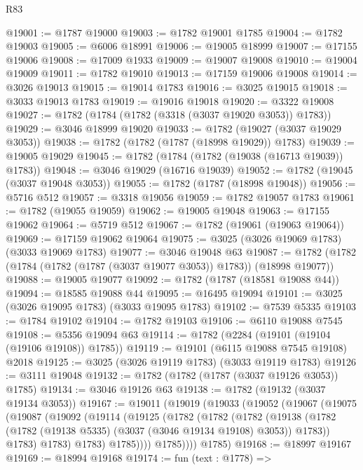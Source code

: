 \begin{lexlean}{R83}
\begin{coremodule}
@19001 := @1787 @19000
@19003 := @1782 @19001 @1785
@19004 := @1782 @19003
@19005 := @6006 @18991
@19006 := @19005 @18999
@19007 := @17155 @19006
@19008 := @17009 @1933
@19009 := @19007 @19008
@19010 := @19004 @19009
@19011 := @1782 @19010
@19013 := @17159 @19006 @19008
@19014 := @3026 @19013
@19015 := @19014 @1783
@19016 := @3025 @19015
@19018 := @3033 @19013 @1783
@19019 := @19016 @19018
@19020 := @3322 @19008
@19027 := @1782 (@1784 (@1782 (@3318 (@3037 @19020 @3053)) @1783))
@19029 := @3046 @18999 @19020
@19033 := @1782 (@19027 (@3037 @19029 @3053))
@19038 := @1782 (@1782 (@1787 (@18998 @19029)) @1783)
@19039 := @19005 @19029
@19045 := @1782 (@1784 (@1782 (@19038 (@16713 @19039)) @1783))
@19048 := @3046 @19029 (@16716 @19039)
@19052 := @1782 (@19045 (@3037 @19048 @3053))
@19055 := @1782 (@1787 (@18998 @19048))
@19056 := @5716 @512
@19057 := @3318 @19056
@19059 := @1782 @19057 @1783
@19061 := @1782 (@19055 @19059)
@19062 := @19005 @19048
@19063 := @17155 @19062
@19064 := @5719 @512
@19067 := @1782 (@19061 (@19063 @19064))
@19069 := @17159 @19062 @19064
@19075 := @3025 (@3026 @19069 @1783) (@3033 @19069 @1783)
@19077 := @3046 @19048 @63
@19087 := @1782 (@1782 (@1784 (@1782 (@1787 (@3037 @19077 @3053)) @1783)) (@18998 @19077))
@19088 := @19005 @19077
@19092 := @1782 (@1787 (@18581 @19088 @44))
@19094 := @18585 @19088 @44
@19095 := @16495 @19094
@19101 := @3025 (@3026 @19095 @1783) (@3033 @19095 @1783)
@19102 := @7539 @5335
@19103 := @1784 @19102
@19104 := @1782 @19103
@19106 := @6110 @19088 @7545
@19108 := @5356 @19094 @63
@19114 := @1782 (@2284 (@19101 (@19104 (@19106 @19108)) @1785))
@19119 := @19101 (@6115 @19088 @7545 @19108) @2018
@19125 := @3025 (@3026 @19119 @1783) (@3033 @19119 @1783)
@19126 := @3111 @19048
@19132 := @1782 (@1782 (@1787 (@3037 @19126 @3053)) @1785)
@19134 := @3046 @19126 @63
@19138 := @1782 (@19132 (@3037 @19134 @3053))
@19167 := @19011
    (@19019
      (@19033
        (@19052
          (@19067
            (@19075
              (@19087
                (@19092
                  (@19114
                    (@19125
                      (@1782
                        (@1782
                          (@1782
                            (@19138
                              (@1782
                                (@1782 (@19138 @5335) (@3037 (@3046 @19134 @19108) @3053))
                                @1783))
                            @1783)
                          @1783)
                        @1783)
                      @1785))))
              @1785))))
      @1785)
@19168 := @18997 @19167
@19169 := @18994 @19168
@19174 := fun (text : @1778) =>

\end{coremodule}
\end{lexlean}
